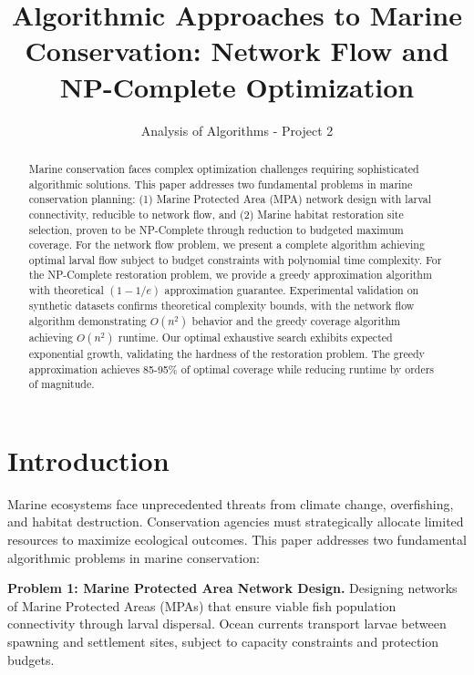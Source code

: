\documentclass[sigconf,nonacm]{acmart}
\begin{document}
\title{Algorithmic Approaches to Marine Conservation: Network Flow and NP-Complete Optimization}

\author{Analysis of Algorithms - Project 2}

\begin{abstract}
Marine conservation faces complex optimization challenges requiring sophisticated algorithmic solutions. This paper addresses two fundamental problems in marine conservation planning: (1) Marine Protected Area (MPA) network design with larval connectivity, reducible to network flow, and (2) Marine habitat restoration site selection, proven to be NP-Complete through reduction to budgeted maximum coverage. For the network flow problem, we present a complete algorithm achieving optimal larval flow subject to budget constraints with polynomial time complexity. For the NP-Complete restoration problem, we provide a greedy approximation algorithm with theoretical $(1-1/e)$ approximation guarantee. Experimental validation on synthetic datasets confirms theoretical complexity bounds, with the network flow algorithm demonstrating $O(n^2)$ behavior and the greedy coverage algorithm achieving $O(n^2)$ runtime. Our optimal exhaustive search exhibits expected exponential growth, validating the hardness of the restoration problem. The greedy approximation achieves 85-95\% of optimal coverage while reducing runtime by orders of magnitude.
\end{abstract}


\maketitle

\section{Introduction}

Marine ecosystems face unprecedented threats from climate change, overfishing, and habitat destruction. Conservation agencies must strategically allocate limited resources to maximize ecological outcomes. This paper addresses two fundamental algorithmic problems in marine conservation:

\textbf{Problem 1: Marine Protected Area Network Design.} Designing networks of Marine Protected Areas (MPAs) that ensure viable fish population connectivity through larval dispersal. Ocean currents transport larvae between spawning and settlement sites, subject to capacity constraints and protection budgets.
\end{document}
